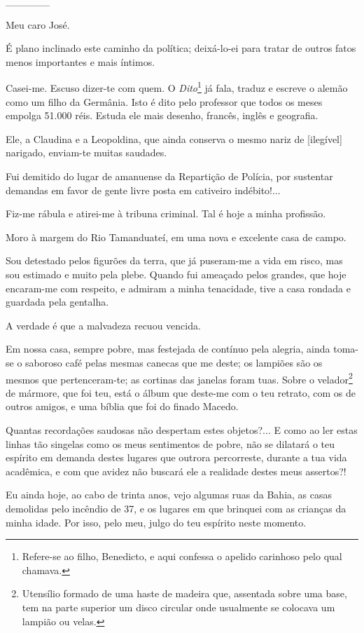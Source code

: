 \_\_\_\_\_\_

Meu caro José.

É plano inclinado este caminho da política; deixá-lo-ei para tratar de
outros fatos menos importantes e mais íntimos.

Casei-me. Escuso dizer-te com quem. O \emph{Dito}\footnote{Refere-se
  ao filho, Benedicto, e aqui confessa o apelido carinhoso pelo qual
  chamava.} já fala, traduz e escreve o alemão como um filho da
Germânia. Isto é dito pelo professor que todos os meses empolga 51.000
réis. Estuda ele mais desenho, francês, inglês e geografia.

Ele, a Claudina e a Leopoldina, que ainda conserva o mesmo nariz de
{[}ilegível{]} narigado, enviam-te muitas saudades.

Fui demitido do lugar de amanuense da Repartição de Polícia, por
sustentar demandas em favor de gente livre posta em cativeiro
indébito!...

Fiz-me rábula e atirei-me à tribuna criminal. Tal é hoje a minha
profissão.

Moro à margem do Rio Tamanduateí, em uma nova e excelente casa de campo.

Sou detestado pelos figurões da terra, que já puseram-me a vida em
risco, mas sou estimado e muito pela plebe. Quando fui ameaçado pelos
grandes, que hoje encaram-me com respeito, e admiram a minha tenacidade,
tive a casa rondada e guardada pela gentalha.

A verdade é que a malvadeza recuou vencida.

Em nossa casa, sempre pobre, mas festejada de contínuo pela alegria,
ainda toma-se o saboroso café pelas mesmas canecas que me deste; os
lampiões são os mesmos que pertenceram-te; as cortinas das janelas foram
tuas. Sobre o velador\footnote{Utensílio formado de uma haste de
  madeira que, assentada sobre uma base, tem na parte superior um disco
  circular onde usualmente se colocava um lampião ou velas.} de mármore,
que foi teu, está o álbum que deste-me com o teu retrato, com os de
outros amigos, e uma bíblia que foi do finado Macedo.

Quantas recordações saudosas não despertam estes objetos?... E como ao
ler estas linhas tão singelas como os meus sentimentos de pobre, não se
dilatará o teu espírito em demanda destes lugares que outrora
percorreste, durante a tua vida acadêmica, e com que avidez não buscará
ele a realidade destes meus assertos?!

Eu ainda hoje, ao cabo de trinta anos, vejo algumas ruas da Bahia, as
casas demolidas pelo incêndio de 37, e os lugares em que brinquei com as
crianças da minha idade. Por isso, pelo meu, julgo do teu espírito neste
momento.

